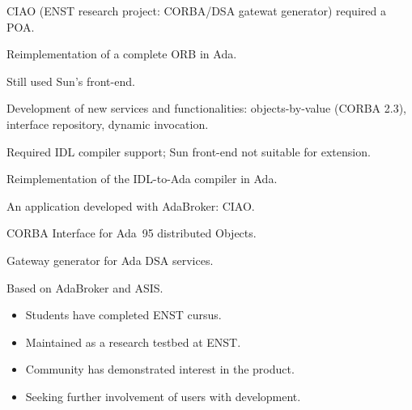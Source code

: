 \documentclass[a4,slidesec]{seminar}
\begin{document}
\begin{slide}


CIAO (ENST research project: CORBA/DSA gatewat
generator) required a POA.

Reimplementation of a complete ORB in Ada.

Still used Sun's front-end.
\end{slide}

\begin{slide}


Development of new services and functionalities: objects-by-value (CORBA 2.3),
interface repository, dynamic invocation.

Required IDL compiler support; Sun front-end not suitable for extension.

Reimplementation of the IDL-to-Ada compiler in Ada.

\end{slide}

\begin{slide}


An application developed with AdaBroker: CIAO.

CORBA Interface for Ada~95 distributed Objects.

Gateway generator for Ada DSA services.

Based on AdaBroker and ASIS.

\end{slide}

\begin{slide}

\begin{itemize}
\item Students have completed ENST cursus.
\item Maintained as a research testbed at ENST.
\item Community has demonstrated interest in the product.
\item Seeking further involvement of users with development.
\end{itemize}

\end{slide}
\end{document}
